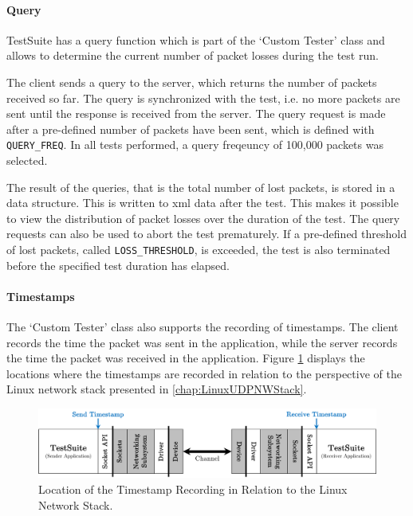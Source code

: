 \paragraph{Query} \label{chap:targetcom:query}
TestSuite has a query function which is part of the `Custom Tester' class and allows to determine the current number of packet losses during the test run.

The client sends a query to the server, which returns the number of packets received so far. The query is synchronized with the test, i.e. no more packets are sent until the response is received from the server. The query request is made after a pre-defined number of packets have been sent, which is defined with \texttt{QUERY\_FREQ}. In all tests performed, a query freqeuncy of 100,000 packets was selected.

The result of the queries, that is the total number of lost packets, is stored in a data structure. This is written to \ac{xml} data after the test. This makes it possible to view the distribution of packet losses over the duration of the test. The query requests can also be used to abort the test prematurely. If a pre-defined threshold of lost packets, called \texttt{LOSS\_THRESHOLD}, is exceeded, the test is also terminated before the specified test duration has elapsed.

\paragraph{Timestamps} \label{chap:targetcom:timestamps}
The `Custom Tester' class also supports the recording of timestamps. The client records the time the packet was sent in the application, while the server records the time the packet was received in the application. Figure \ref{fig:TimestampLocation} displays the locations where the timestamps are recorded in relation to the perspective of the Linux network stack presented in \ref{chap:LinuxUDPNWStack}.

\begin{figure}[h!]
    \centering
    \includegraphics[width=1\linewidth]{figures/method/timestamps.pdf}
    \caption{Location of the Timestamp Recording in Relation to the Linux Network Stack.}
    \label{fig:TimestampLocation}
\end{figure}


